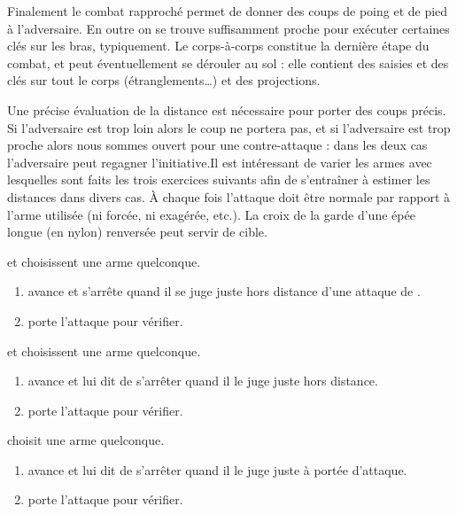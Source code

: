 Finalement le combat rapproché permet de donner des coups de poing et de pied à l'adversaire.
En outre on se trouve suffisamment proche pour exécuter certaines clés sur les bras, typiquement.
Le corps-à-corps constitue la dernière étape du combat, et peut éventuellement se dérouler au sol : elle contient des saisies et des clés sur tout le corps (étranglements…) et des projections.

Une précise évaluation de la distance est nécessaire pour porter des coups précis.
Si l'adversaire est trop loin alors le coup ne portera pas, et si l'adversaire est trop proche alors nous sommes ouvert pour une contre-attaque : dans les deux cas l'adversaire peut regagner l'initiative.Il est intéressant de varier les armes avec lesquelles sont faits les trois exercices suivants afin de s'entraîner à estimer les distances dans divers cas.
À chaque fois l'attaque doit être normale par rapport à l'arme utilisée (ni forcée, ni exagérée, etc.).
La croix de la garde d'une épée longue (en nylon) renversée peut servir de cible.


\begin{exercice}
	\A et \D choisissent une arme quelconque.

	\begin{enumerate}
		\item \A avance et s'arrête quand il se juge juste hors distance d'une attaque de \D.
		
		\item \D porte l'attaque pour vérifier.
	\end{enumerate}

\end{exercice}


\begin{exercice}
	\A et \D choisissent une arme quelconque.

	\begin{enumerate}
		\item \A avance et \D lui dit de s'arrêter quand il le juge juste hors distance.
		
		\item \A porte l'attaque pour vérifier.
	\end{enumerate}

\end{exercice}


\begin{exercice}
	\A choisit une arme quelconque.

	\begin{enumerate}
		\item \D avance et \A lui dit de s'arrêter quand il le juge juste à portée d'attaque.
		
		\item \A porte l'attaque pour vérifier.
	\end{enumerate}

\end{exercice}


